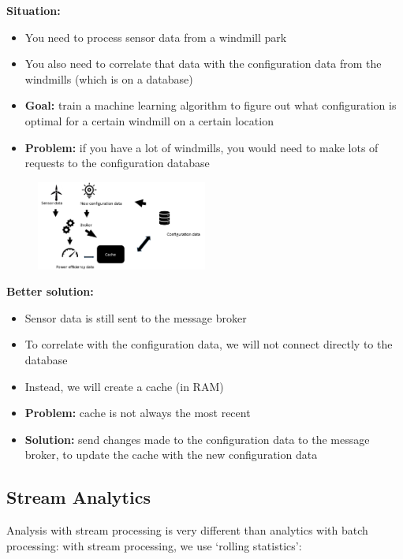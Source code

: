 \documentclass{article}
\begin{document}
\textbf{Situation:}

\begin{itemize}
    \item You need to process sensor data from a windmill park
    \item You also need to correlate that data with the configuration data from the windmills (which is on a database)
    \item \textbf{Goal:} train a machine learning algorithm to figure out what configuration is optimal for a certain windmill on a certain location
    \item \textbf{Problem:} if you have a lot of windmills, you would need to make lots of requests to the configuration database
\end{itemize}

\begin{figure}[H]
    \centering
    \includegraphics[width=0.5\textwidth]{events-data-architecture-2.png}
\end{figure}

\textbf{Better solution:}

\begin{itemize}
    \item Sensor data is still sent to the message broker
    \item To correlate with the configuration data, we will not connect directly to the database
    \item Instead, we will create a cache (in RAM)
    \item \textbf{Problem:} cache is not always the most recent 
    \item \textbf{Solution:} send changes made to the configuration data to the message broker, to update the cache with the new configuration data
\end{itemize}

\subsection{Stream Analytics}

Analysis with stream processing is very different than analytics with batch processing: 
with stream processing, we use `rolling statistics':
\end{document}
